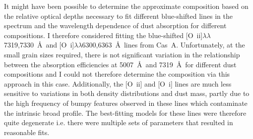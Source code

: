 It might have been possible  to determine the approximate composition based on the relative optical depths necessary to fit different blue-shifted lines in the spectrum and the wavelength dependence of dust absorption for different compositions.  I therefore considered fitting the blue-shifted [O~{\sc ii}]$\lambda\lambda$7319,7330~\AA\  and [O~{\sc i}]$\lambda\lambda$6300,6363~\AA\  lines from Cas~A.  Unfortunately, at the small grain sizes required, there is not significant variation in the relationship between the absorption efficiencies at 5007~\AA\  and 7319~\AA\  for different dust compositions and I could not  therefore determine the composition via this approach in this case.  Additionally, the [O~{\sc ii}] and [O~{\sc i}] lines are much less sensitive to variations in both density distributions and dust mass, partly due to the high frequency of bumpy features observed in these lines which contaminate the intrinsic broad profile.  The best-fitting models for these lines were therefore quite degenerate i.e. there were multiple sets of parameters that resulted in reasonable fits.  
